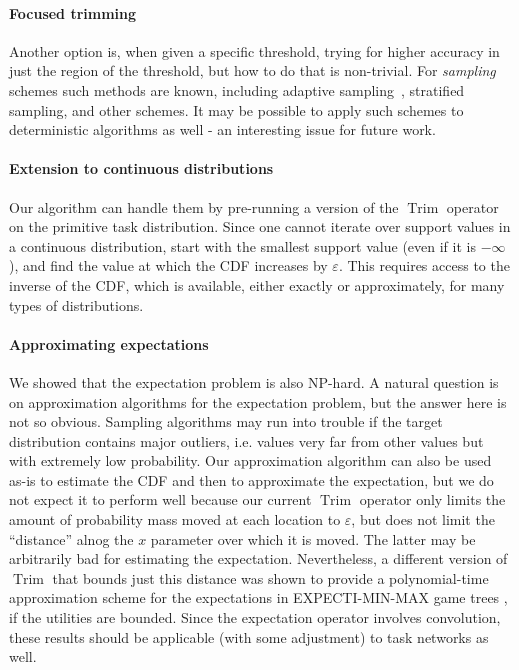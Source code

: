 \documentclass[review]{elsarticle}
\DeclareMathOperator{\Trim}{Trim}
\begin{document}
\paragraph{\bf Focused trimming} Another option is, when given a specific threshold, trying for higher accuracy in just the region of the
threshold, but how to do that is non-trivial. For {\em sampling} schemes such methods are known, including adaptive 
sampling~\cite{bucher1988adaptive,lipton1990practical},
stratified sampling, and other schemes.
It may be possible to apply such schemes to deterministic algorithms as well - an interesting issue for future work. 

\paragraph{\bf Extension to continuous distributions} Our algorithm can handle them by
pre-running a version of the $\Trim$ operator on the primitive task distribution. Since one cannot iterate over support values
in a continuous distribution, start with the smallest support value (even if it is $- \infty$), and find the value at which the CDF
increases by $\varepsilon$. This requires access to the inverse of the CDF, which is available, either exactly or approximately,
for many types of distributions. %

\paragraph{\bf Approximating expectations} We showed that the expectation problem is also NP-hard. A natural question is on approximation algorithms for the expectation problem, but the answer here is not so obvious. Sampling algorithms may run into trouble if the target distribution contains major outliers, i.e. values very far from other values but with extremely low probability. Our approximation algorithm can also be used as-is to estimate the CDF and then to approximate the expectation, but we do not expect it to perform well because our current $\Trim$ operator only limits the amount of probability mass moved at each location to $\varepsilon$, but does not limit the ``distance'' alnog the $x$ parameter over which it is moved. The latter may be arbitrarily bad for estimating the expectation. Nevertheless, a different version of $\Trim$ that bounds just this distance was shown to provide a polynomial-time approximation scheme for the expectations in EXPECTI-MIN-MAX game trees \cite{shperbergmonte},  if the utilities are bounded. Since the expectation operator involves convolution, these results should be applicable (with some adjustment) to task networks as well.
\end{document}
